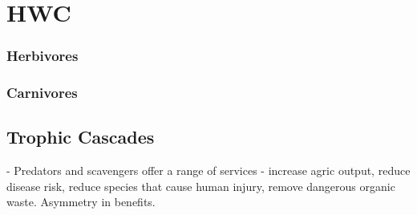 \section{HWC}

\subsubsection{Herbivores}

\subsubsection{Carnivores}

\subsection{Trophic Cascades}

\cite{O_Bryan_2018} - Predators and scavengers offer a range of services - increase agric output, reduce disease risk, reduce species that cause human injury, remove dangerous organic waste. Asymmetry in benefits.


